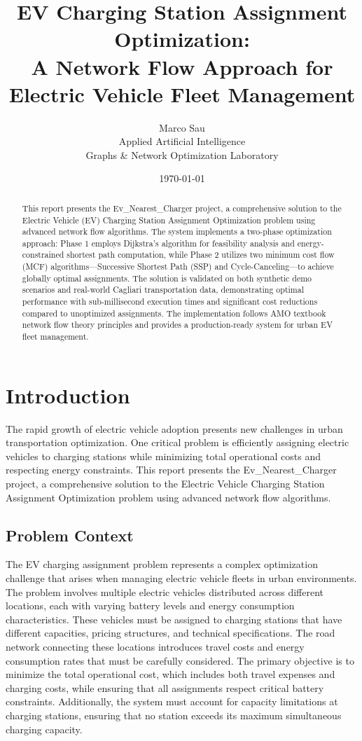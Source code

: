 \documentclass[12pt,a4paper]{article}
\title{\textbf{EV Charging Station Assignment Optimization:\\A Network Flow Approach for Electric Vehicle Fleet Management}}
\author{Marco Sau\\Applied Artificial Intelligence\\Graphs \& Network Optimization Laboratory}
\date{\today}
\begin{document}
\maketitle

\begin{abstract}
This report presents the Ev\_Nearest\_Charger project, a comprehensive solution to the Electric Vehicle (EV) Charging Station Assignment Optimization problem using advanced network flow algorithms. The system implements a two-phase optimization approach: Phase 1 employs Dijkstra's algorithm for feasibility analysis and energy-constrained shortest path computation, while Phase 2 utilizes two minimum cost flow (MCF) algorithms—Successive Shortest Path (SSP) and Cycle-Canceling—to achieve globally optimal assignments. The solution is validated on both synthetic demo scenarios and real-world Cagliari transportation data, demonstrating optimal performance with sub-millisecond execution times and significant cost reductions compared to unoptimized assignments. The implementation follows AMO textbook network flow theory principles and provides a production-ready system for urban EV fleet management.
\end{abstract}

\tableofcontents
\newpage

\section{Introduction}

The rapid growth of electric vehicle adoption presents new challenges in urban transportation optimization. One critical problem is efficiently assigning electric vehicles to charging stations while minimizing total operational costs and respecting energy constraints. This report presents the Ev\_Nearest\_Charger project, a comprehensive solution to the Electric Vehicle Charging Station Assignment Optimization problem using advanced network flow algorithms.

\subsection{Problem Context}

The EV charging assignment problem represents a complex optimization challenge that arises when managing electric vehicle fleets in urban environments. The problem involves multiple electric vehicles distributed across different locations, each with varying battery levels and energy consumption characteristics. These vehicles must be assigned to charging stations that have different capacities, pricing structures, and technical specifications. The road network connecting these locations introduces travel costs and energy consumption rates that must be carefully considered. The primary objective is to minimize the total operational cost, which includes both travel expenses and charging costs, while ensuring that all assignments respect critical battery constraints. Additionally, the system must account for capacity limitations at charging stations, ensuring that no station exceeds its maximum simultaneous charging capacity.
\end{document}
